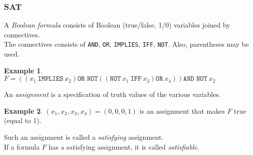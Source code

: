\documentclass[12pt]{article}
\theoremstyle{plain}
\theoremstyle{definition}
\newtheorem*{ex*}{Example}
\begin{document}
\subsubsection{SAT}
A \emph{Boolean formula} consists of Boolean (true/false, 1/0) variables joined by connectives. \\
The connectives consists of \texttt{AND}, \texttt{OR}, \texttt{IMPLIES}, \texttt{IFF}, \texttt{NOT}.
Also, parentheses may be used.

\begin{ex*}
  $F = \left(\left(x_{1}~\texttt{IMPLIES}~x_{2}\right)\texttt{OR NOT}\left(\left(\texttt{NOT}~x_{1}~\texttt{IFF}~x_{3}\right)\texttt{OR}~x_{4}\right)\right)\texttt{AND NOT}~x_{2}$
\end{ex*}

An \emph{assignment} is a specification of truth values of the various variables.

\begin{ex*}
$(x_{1}, x_{2}, x_{3}, x_{4}) = (0, 0, 0, 1)$ is an assignment that makes $F$ true (equal to 1).
\end{ex*}

Such an assignment is called a \emph{satisfying} assignment. \\
If a formula $F$ has a satisfying assignment, it is called \emph{satisfiable}. \\
\end{document}
